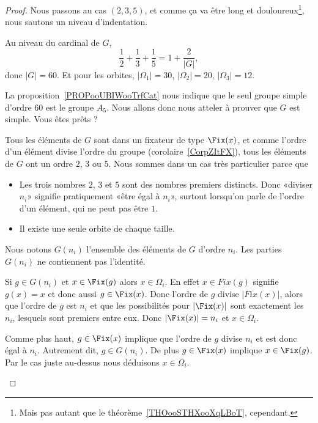 \begin{proof}
	Nous passons au cas \( (2,3,5)\), et comme ça va être long et douloureux\footnote{Mais pas autant que le théorème~\ref{THOooSTHXooXqLBoT}, cependant.}, nous sautons un niveau d'indentation.

	Au niveau du cardinal de \( G\),
	\begin{equation}
		\frac{1}{ 2 }+\frac{1}{ 3 }+\frac{1}{ 5 }=1+\frac{ 2 }{ | G | },
	\end{equation}
	donc \( | G |=60\). Et pour les orbites, \( | \Omega_1 |=30\), \( | \Omega_2 |=20\), \( | \Omega_3 |=12\).

	La proposition~\ref{PROPooUBIWooTrfCat} nous indique que le seul groupe simple d'ordre \( 60\) est le groupe \( A_5\). Nous allons donc nous atteler à prouver que \( G\) est simple. Vous êtes prêts ?

	\begin{subproof}
		Tous les éléments de \( G\) sont dans un fixateur de type \( \Fix(x)\), et comme l'ordre d'un élément divise l'ordre du groupe (corolaire~\ref{CorpZItFX}), tous les éléments de \( G\) ont un ordre \( 2\), \( 3\) ou \( 5\). Nous sommes dans un cas très particulier parce que
		\begin{itemize}
			\item Les trois nombres \( 2\), \( 3\) et \( 5\) sont des nombres premiers distincts. Donc «diviser \( n_i\)» signifie pratiquement «être égal à \( n_i\)», surtout lorsqu'on parle de l'ordre d'un élément, qui ne peut pas être \( 1\).
			\item Il existe une seule orbite de chaque taille.
		\end{itemize}
		Nous notons \( G(n_i)\) l'ensemble des éléments de \( G\) d'ordre \( n_i\). Les parties \( G(n_i)\) ne contiennent pas l'identité.

		Si \( g\in G(n_i)\) et \( x\in\Fix(g)\) alors \( x\in \Omega_i\). En effet \( x\in Fix(g)\) signifie \( g(x)=x\) et donc aussi \( g\in\Fix(x)\). Donc l'ordre de \( g\) divise \( | Fix(x) |\), alors que l'ordre de \( g\) est \( n_i\) et que les possibilités pour \( | \Fix(x) |\) sont exactement les \( n_i\), lesquels sont premiers entre eux. Donc \( | \Fix(x) |=n_i\) et \( x\in \Omega_i\).

		\spitem[\( | \Fix(x) |=n_i\) implique \( x\in \Omega_i\)]
		Comme plus haut, \( g\in\Fix(x)\) implique que l'ordre de \( g\) divise \( n_i\) et est donc égal à \( n_i\). Autrement dit, \( g\in G(n_i)\). De plus \( g\in\Fix(x)\) implique \( x\in\Fix(g)\). Par le cas juste au-dessus nous déduisons \( x\in\Omega_i\).


\end{subproof}
\end{proof}
